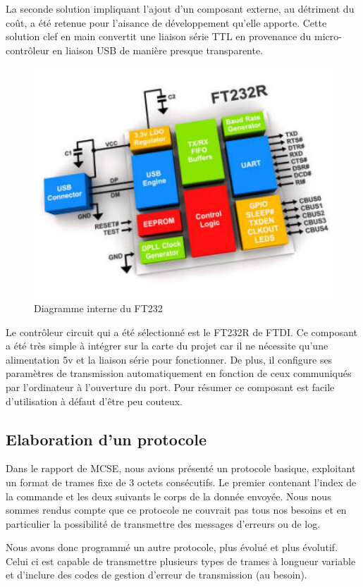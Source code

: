 \documentclass[11pt, french]{article} %
\begin{document}
La seconde solution impliquant l'ajout d'un composant externe, au détriment du coût, a été retenue pour l'aisance de développement qu'elle apporte. Cette solution clef en main convertit une liaison série TTL en provenance du micro-contrôleur en liaison USB de manière presque transparente.

\begin{figure}[h!]
	\centering
	\includegraphics[width = 12cm]{SolutionNumerique/diagrammeFT232.jpg} 
	\caption{Diagramme interne du FT232}
\end{figure}

Le contrôleur circuit qui a été sélectionné est le FT232R de FTDI. Ce composant a été très simple à intégrer sur la carte du projet car il ne nécessite qu'une alimentation 5v et la liaison série pour fonctionner. De plus, il configure ses paramètres de transmission automatiquement en fonction de ceux communiqués par l'ordinateur à l'ouverture du port. Pour résumer ce composant est facile d'utilisation à défaut d'être peu couteux.

\subsection{Elaboration d'un protocole}
Dans le rapport de MCSE, nous avions présenté un protocole basique, exploitant un format de trames fixe de 3 octets consécutifs. Le premier contenant l'index de la commande et les deux suivants le corps de la donnée envoyée. Nous nous sommes rendus compte que ce protocole ne couvrait pas tous nos besoins et en particulier la possibilité de transmettre des messages d'erreurs ou de log.

\medskip
Nous avons donc programmé un autre protocole, plus évolué et plus évolutif. Celui ci est capable de transmettre plusieurs types de trames à longueur variable et d'inclure des codes de gestion d'erreur de transmission (au besoin).
\end{document}
